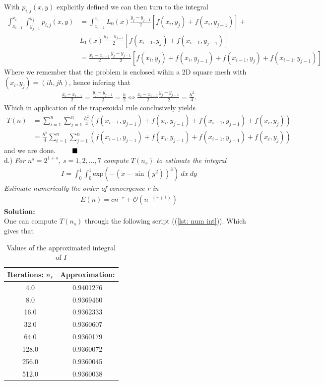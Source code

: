 \documentclass[12pt,
               a4paper,
               article,
               oneside,
               english,oldfontcommands]{memoir}
\newcommand{\Q}{ \qquad \hfill \blacksquare}
\let\oldref\ref
\renewcommand{\ref}[1]{(\oldref{#1})}
\newcommand{\spaze}{\vspace{4mm}\\}
\begin{document}
With $p_{i,j}(x,y)$ explicitly defined we can then turn to the integral 
\begin{align*}
\int_{x_{i-1}}^{x_{i}} \int_{y_{j-1}}^{y_{j}} p_{i,j}(x,y) &= \int_{x_{i-1}}^{x_{i}} L_{0}(x)  \frac{y_{j} - y_{j-1}}{2}\left[f(x_{i}, y_{j}) +  f(x_{i}, y_{j-1}) \right] + \\[5pt] 
&L_{1}(x) \frac{y_{j} - y_{j-1}}{2} \left[ f(x_{i-1}, y_{j}) + f(x_{i-1}, y_{j-1})\right] \\[10pt]
&=  \frac{x_{i} - x_{i-1}}{2} \frac{y_{j} - y_{j-1}}{2} \left[ f(x_{i}, y_{j}) +  f(x_{i}, y_{j-1})  + f(x_{i-1}, y_{j}) + f(x_{i-1}, y_{j-1})  \right]
\end{align*}
Where we remember that the problem is enclosed wihin a 2D square mesh with $(x_i, y_j) = (ih, jh)$, hence infering that 
\begin{align*}
\frac{x_{i} - x_{i-1}}{2} = \frac{y_{j} - y_{j-1}}{2} = \frac{h}{2} \iff \frac{x_{i} - x_{i-1}}{2} \frac{y_{j} - y_{j-1}}{2} = \frac{h^2}{4}.
\end{align*}
Which in application of the  trapezoidal rule conclusively yields 
\begin{align*}
T(n) &= \sum_{i=1}^{n}\sum_{j=1}^{n} \frac{h^2}{4} \left( f(x_{i-1}, y_{j-1}) + f(x_i, y_{j-1}) +  f(x_{i-1}, y_{j-1}) +  f(x_i, y_{j}) \right) \\[5pt]
&= \frac{h^2}{4}\sum_{i=1}^{n}\sum_{j=1}^{n} \left( f(x_{i-1}, y_{j-1}) + f(x_i, y_{j-1}) +  f(x_{i-1}, y_{j-1}) +  f(x_i, y_{j}) \right)
\end{align*}
and we are done. $\Q$
\spaze
d.) \emph{ For $n^s = 2^{1+s}, \ s = 1,2, \ldots, 7$ compute $T(n_s)$ to estimate the integral}
\begin{align*}
I = \int_{0}^{1} \int_{0}^{1} \text{exp}(-(x - \sin(y^2))^3) \ dx \ dy
\end{align*}
\emph{Estimate numerically the order of convergence r in}
\begin{align*}
E(n) = cn^{-r} + \mathcal{O}(n^{-(r+1)})
\end{align*}
\textbf{Solution:} \spaze
One can compute $T(n_s)$ through the following script (\ref{lst: num int}). Which gives that 
\begin{table}[H] 
  \begin{center} 
    \label{tab: num_int}
    \begin{tabular}{c c} 
      Iterations: $n_s$ & Approximation:\\
      \hline
     	  4.0      &  0.9401276\\
            8.0     &   0.9369460\\
            16.0      &  0.9362333\\
            32.0        & 0.9360607\\
          64.0       & 0.9360179\\
         128.0        &0.9360072\\
         256.0        & 0.9360045\\
         512.0      &  0.9360038\\
      \hline 
    \end{tabular}
     \caption{Values of the approximated integral of $I$}
  \end{center}
\end{table}
\end{document}
